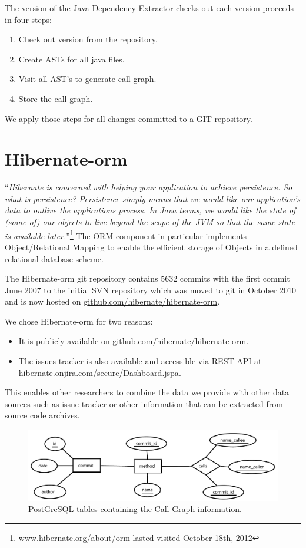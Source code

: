 \documentclass[conference]{IEEEtran}
\begin{document}
The version of the Java Dependency Extractor checks-out each version proceeds in four steps:
\begin{enumerate}
\item Check out version from the repository.
\item Create ASTs for all java files.
\item Visit all AST's to generate call graph.
\item Store the call graph.
\end{enumerate}
We apply those steps for all changes committed to a GIT repository.

\section{Hibernate-orm}
\label{sec:orm}
``\emph{Hibernate is concerned with helping your application to achieve persistence.  So what is persistence?  Persistence simply means that we would like our application's data to outlive the applications process.  In Java terms, we would like the state of (some of) our objects to live beyond the scope of the JVM so that the same state is available later.}''\footnote{\url{www.hibernate.org/about/orm} lasted visited October 18th, 2012}
The ORM component in particular implements Object/Relational Mapping to enable the efficient storage of Objects in a defined relational database scheme.

The Hibernate-orm git repository contains 5632 commits with the first commit June 2007 to the initial SVN repository which was moved to git in October 2010 and is now hosted on \url{github.com/hibernate/hibernate-orm}.

We chose Hibernate-orm for two reasons:
\begin{itemize}
\item It is publicly available on \url{github.com/hibernate/hibernate-orm}.
\item The issues tracker is also available and accessible via REST API at \url{hibernate.onjira.com/secure/Dashboard.jspa}.
\end{itemize}
This enables other researchers to combine the data we provide with other data sources such as issue tracker or other information that can be extracted from source code archives.


\begin{figure}[t!]
\centering
\includegraphics[width=\textwidth]{er}
\caption{PostGreSQL tables containing the Call Graph information.}
\label{er}
\end{figure}
\end{document}
